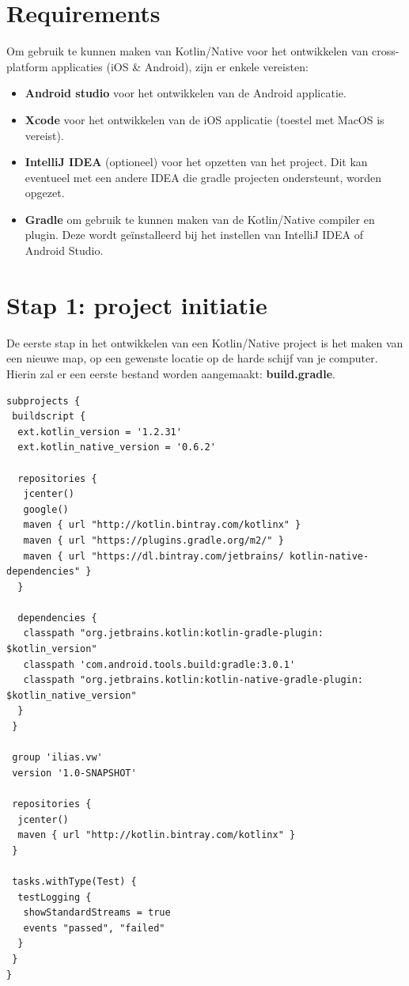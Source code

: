 \section{Requirements}
Om gebruik te kunnen maken van Kotlin/Native voor het ontwikkelen van cross-platform applicaties (iOS \& Android), zijn er enkele vereisten:
\begin{itemize}
	\item \textbf{Android studio} voor het ontwikkelen van de Android applicatie.
	\item \textbf{Xcode} voor het ontwikkelen van de iOS applicatie (toestel met MacOS is vereist).
	\item \textbf{IntelliJ IDEA} (optioneel) voor het opzetten van het project. Dit kan eventueel met een andere IDEA die gradle projecten ondersteunt, worden opgezet.
	\item \textbf{Gradle} om gebruik te kunnen maken van de Kotlin/Native compiler en plugin. Deze wordt geïnstalleerd bij het instellen van IntelliJ IDEA of Android Studio.
\end{itemize}

\section{Stap 1: project initiatie}
De eerste stap in het ontwikkelen van een Kotlin/Native project is het maken van een nieuwe map, op een gewenste locatie op de harde schijf van je computer. Hierin zal er een eerste bestand worden aangemaakt: \textbf{build.gradle}.

\begin{lstlisting}
subprojects {
 buildscript {
  ext.kotlin_version = '1.2.31'
  ext.kotlin_native_version = '0.6.2'
		
  repositories {
   jcenter()
   google()
   maven { url "http://kotlin.bintray.com/kotlinx" }
   maven { url "https://plugins.gradle.org/m2/" }
   maven { url "https://dl.bintray.com/jetbrains/ kotlin-native-dependencies" }
  }

  dependencies {
   classpath "org.jetbrains.kotlin:kotlin-gradle-plugin: $kotlin_version"
   classpath 'com.android.tools.build:gradle:3.0.1'
   classpath "org.jetbrains.kotlin:kotlin-native-gradle-plugin: $kotlin_native_version"
  }
 }
	
 group 'ilias.vw'
 version '1.0-SNAPSHOT'
	
 repositories {
  jcenter()
  maven { url "http://kotlin.bintray.com/kotlinx" }
 }
	
 tasks.withType(Test) {
  testLogging {
   showStandardStreams = true
   events "passed", "failed"
  }
 }
}
\end{lstlisting}
